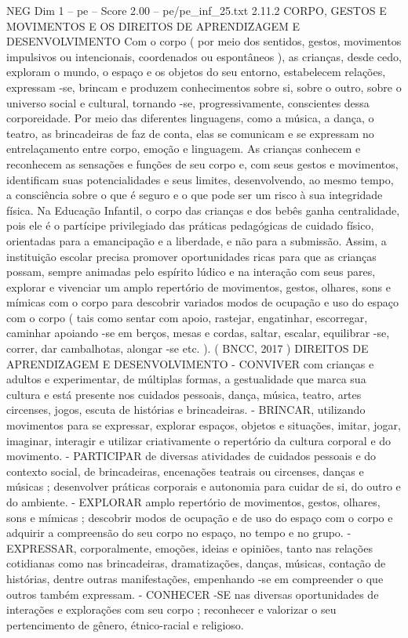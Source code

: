 \begin{textsample}{NEG Dim 1 – pe – Score 2.00 – pe/pe\_inf\_25.txt}  \label{ex:f1_neg_042}
2.11.2 CORPO, GESTOS E MOVIMENTOS E OS DIREITOS DE APRENDIZAGEM E DESENVOLVIMENTO Com o corpo ( por meio dos sentidos, gestos, movimentos impulsivos ou intencionais, coordenados ou espontâneos ), as crianças, desde cedo, exploram o mundo, o espaço e os objetos do seu entorno, estabelecem relações, expressam -se, brincam e produzem conhecimentos sobre si, sobre o outro, sobre o universo social e cultural, tornando -se, progressivamente, conscientes dessa corporeidade.
Por meio das diferentes linguagens, como a música, a dança, o teatro, as brincadeiras de faz de conta, elas se comunicam e se expressam no entrelaçamento entre corpo, emoção e linguagem.
As crianças conhecem e reconhecem as sensações e funções de seu corpo e, com seus gestos e movimentos, identificam suas potencialidades e seus limites, desenvolvendo, ao mesmo tempo, a consciência sobre o que é seguro e o que pode ser um risco à sua integridade física.
Na Educação Infantil, o corpo das crianças e dos bebês ganha centralidade, pois ele é o partícipe privilegiado das práticas pedagógicas de cuidado físico, orientadas para a emancipação e a liberdade, e não para a submissão.
Assim, a instituição escolar precisa promover oportunidades ricas para que as crianças possam, sempre animadas pelo espírito lúdico e na interação com seus pares, explorar e vivenciar um amplo repertório de movimentos, gestos, olhares, sons e mímicas com o corpo para descobrir variados modos de ocupação e uso do espaço com o corpo ( tais como sentar com apoio, rastejar, engatinhar, escorregar, caminhar apoiando -se em berços, mesas e cordas, saltar, escalar, equilibrar -se, correr, dar cambalhotas, alongar -se etc. ). ( BNCC, 2017 ) DIREITOS DE APRENDIZAGEM E DESENVOLVIMENTO - CONVIVER com crianças e adultos e experimentar, de múltiplas formas, a gestualidade que marca sua cultura e está presente nos cuidados pessoais, dança, música, teatro, artes circenses, jogos, escuta de histórias e brincadeiras. - BRINCAR, utilizando movimentos para se expressar, explorar espaços, objetos e situações, imitar, jogar, imaginar, interagir e utilizar criativamente o repertório da cultura corporal e do movimento. - PARTICIPAR de diversas atividades de cuidados pessoais e do contexto social, de brincadeiras, encenações teatrais ou circenses, danças e músicas ; desenvolver práticas corporais e autonomia para cuidar de si, do outro e do ambiente. - EXPLORAR amplo repertório de movimentos, gestos, olhares, sons e mímicas ; descobrir modos de ocupação e de uso do espaço com o corpo e adquirir a compreensão do seu corpo no espaço, no tempo e no grupo. - EXPRESSAR, corporalmente, emoções, ideias e opiniões, tanto nas relações cotidianas como nas brincadeiras, dramatizações, danças, músicas, contação de histórias, dentre outras manifestações, empenhando -se em compreender o que outros também expressam. - CONHECER -SE nas diversas oportunidades de interações e explorações com seu corpo ; reconhecer e valorizar o seu pertencimento de gênero, étnico-racial e religioso.

\end{textsample}
